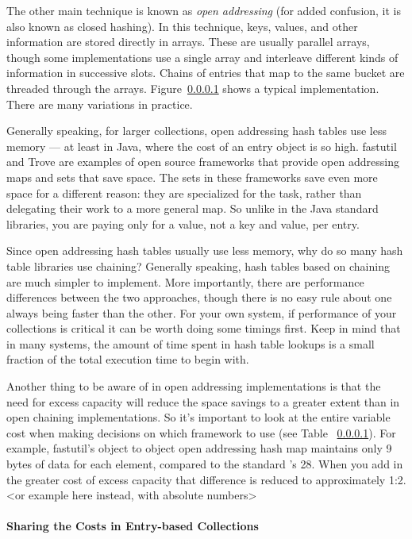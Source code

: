 The other main technique is known as \emph{open addressing} (for added
confusion, it is also known as closed hashing).  In this technique,
keys, values, and other information are stored directly in
arrays. These are usually parallel arrays, though some implementations
use a single array and interleave different kinds of information in
successive slots. Chains of entries that map to the same bucket are threaded through the arrays.
Figure~\ref{} shows a typical implementation. There are many variations in
practice.

Generally speaking, for larger collections, open addressing hash tables use less
memory --- at least in Java, where the cost of an entry object is so high. 
fastutil and Trove are examples of open source frameworks that provide open
addressing maps and sets that save space. The sets in these frameworks
save even more space for a different reason: they are specialized for the task,
rather than delegating their work to a more general map. So unlike in the Java
standard libraries, you are paying only for a value, not a key and value, per
entry.

Since open addressing hash tables usually use less memory, why do so many hash
table libraries use chaining? Generally speaking, hash tables based
on chaining are much simpler to implement. More importantly, there
are performance differences between the two approaches, though there is no easy
rule about one always being faster than the other. For your
own system, if performance of your collections is critical it can be worth doing
some timings first.  Keep in mind that in many systems, the amount of
time spent in hash table lookups is a small fraction of the total execution time to begin with. 

Another thing to be aware of in open addressing implementations is that the
need for excess capacity will reduce the space savings to a greater
extent than in open chaining implementations. So it's important to look at the
entire variable cost when making decisions on which framework to use (see Table
~\ref{}).  For example, fastutil's object to object open addressing
hash map maintains only 9 bytes of data for each element, compared to the standard
's 28. When you add in the greater cost of excess capacity that
difference is reduced to approximately 1:2.  <or example here instead, with absolute numbers>

\paragraph{Sharing the Costs in Entry-based Collections}

